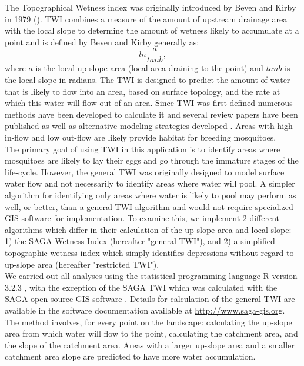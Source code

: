 \documentclass{article}\usepackage[]{graphicx}\usepackage[]{color}
\begin{document}
The Topographical Wetness index was originally introduced by Beven and Kirby in 1979 (\cite{Beven1979}).  TWI combines a measure of the amount of upstream drainage area with the local slope to determine the amount of wetness likely to accumulate at a point and is defined by Beven and Kirby generally as:
$$ln\frac{a}{tanb},$$
where $a$ is the local up-slope area (local area draining to the point) and $tanb$ is the local slope in radians.  The TWI is designed to predict the amount of water that is likely to flow into an area, based on surface topology, and the rate at which this water will flow out of an area.  Since TWI was first defined numerous methods have been developed to calculate it and several review papers have been published \cite{Quinn1995,Sørensen2006} as well as alternative modeling strategies developed \cite{Grabs2009}.  Areas with high in-flow and low out-flow are likely provide habitat for breeding mosquitoes. \\

The primary goal of using TWI in this application is to identify areas where mosquitoes are likely to lay their eggs and go through the immature stages of the life-cycle.  However, the general TWI was originally designed to model surface water flow and not necessarily to identify areas where water will pool. A simpler algorithm for identifying only areas where water is likely to pool may perform as well, or better, than a general TWI algorithm and would not require specialized GIS software for implementation.  To examine this, we implement 2 different algorithms which differ in their calculation of the up-slope area and local slope: 1) the SAGA Wetness Index \cite{Bohner2002} (hereafter "general TWI"), and 2) a simplified topographic wetness index which simply identifies depressions without regard to up-slope area (hereafter "restricted TWI").  \\


We carried out all analyses using the statistical programming language R version 3.2.3 \cite{RCoreTeam2015}, with the exception of the SAGA TWI which was calculated with the SAGA open-source GIS software \cite{Bohner2006}.  Details for calculation of the general TWI are available in the software documentation available at \href{http://www.saga-gis.org/saga_module_doc/2.1.4/ta_hydrology.html}{http://www.saga-gis.org}\cite{Conrad2015}.  The method involves, for every point on the landscape:  calculating the up-slope area from which water will flow to the point,  calculating the catchment area, and the slope of the catchment area.  Areas with a larger up-slope area and a smaller catchment area slope are predicted to have more water accumulation.\\
\end{document}
